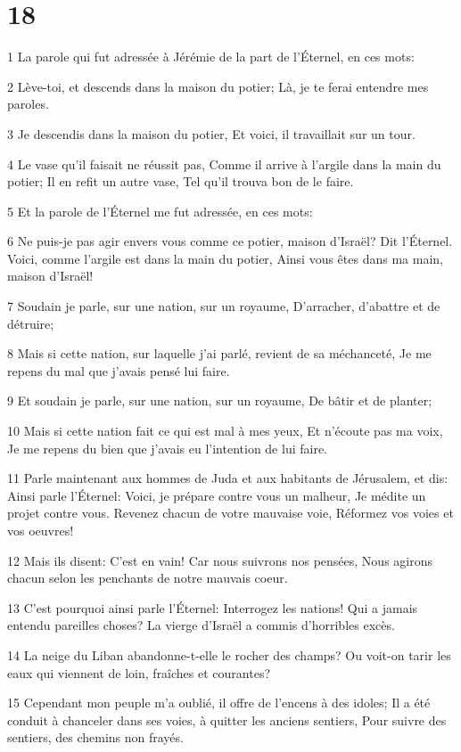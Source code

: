 \chapter{18}

\par 1 La parole qui fut adressée à Jérémie de la part de l'Éternel, en ces mots:
\par 2 Lève-toi, et descends dans la maison du potier; Là, je te ferai entendre mes paroles.
\par 3 Je descendis dans la maison du potier, Et voici, il travaillait sur un tour.
\par 4 Le vase qu'il faisait ne réussit pas, Comme il arrive à l'argile dans la main du potier; Il en refit un autre vase, Tel qu'il trouva bon de le faire.
\par 5 Et la parole de l'Éternel me fut adressée, en ces mots:
\par 6 Ne puis-je pas agir envers vous comme ce potier, maison d'Israël? Dit l'Éternel. Voici, comme l'argile est dans la main du potier, Ainsi vous êtes dans ma main, maison d'Israël!
\par 7 Soudain je parle, sur une nation, sur un royaume, D'arracher, d'abattre et de détruire;
\par 8 Mais si cette nation, sur laquelle j'ai parlé, revient de sa méchanceté, Je me repens du mal que j'avais pensé lui faire.
\par 9 Et soudain je parle, sur une nation, sur un royaume, De bâtir et de planter;
\par 10 Mais si cette nation fait ce qui est mal à mes yeux, Et n'écoute pas ma voix, Je me repens du bien que j'avais eu l'intention de lui faire.
\par 11 Parle maintenant aux hommes de Juda et aux habitants de Jérusalem, et dis: Ainsi parle l'Éternel: Voici, je prépare contre vous un malheur, Je médite un projet contre vous. Revenez chacun de votre mauvaise voie, Réformez vos voies et vos oeuvres!
\par 12 Mais ils disent: C'est en vain! Car nous suivrons nos pensées, Nous agirons chacun selon les penchants de notre mauvais coeur.
\par 13 C'est pourquoi ainsi parle l'Éternel: Interrogez les nations! Qui a jamais entendu pareilles choses? La vierge d'Israël a commis d'horribles excès.
\par 14 La neige du Liban abandonne-t-elle le rocher des champs? Ou voit-on tarir les eaux qui viennent de loin, fraîches et courantes?
\par 15 Cependant mon peuple m'a oublié, il offre de l'encens à des idoles; Il a été conduit à chanceler dans ses voies, à quitter les anciens sentiers, Pour suivre des sentiers, des chemins non frayés.
